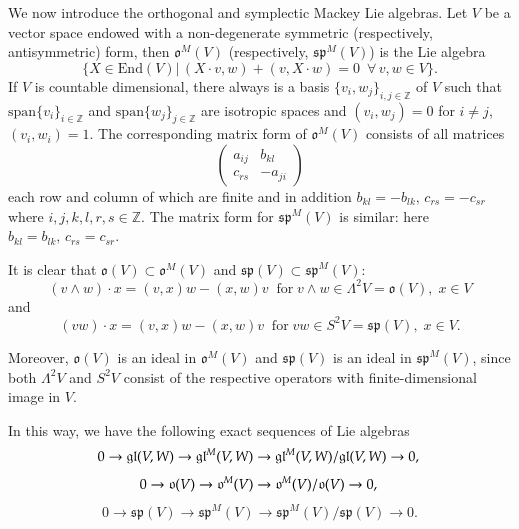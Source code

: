 \documentclass[10pt]{amsart}
\newcommand {\ZZ} {\mathbb {Z}}
\renewcommand{\sp}{\mathfrak{sp}}
\newcommand{\oo}{\mathfrak{o}}
\renewcommand{\span}{\mathrm{span}}
\newcommand{\gl}{\mathfrak{gl}}
\newcommand{\End}{\mathrm{End}}
\begin{document}
We now introduce the orthogonal and symplectic Mackey Lie algebras. Let $V$ be a vector space endowed with a non-degenerate symmetric 
(respectively, antisymmetric) form, then $\oo^M(V)$ (respectively, $\sp^M(V)$) is the Lie algebra
\begin{equation}\label{rel:Liealg}
 \lbrace X \in \End(V)|\,(X\cdot v,w)+(v,X\cdot w)=0 \,\,\, \forall \, v,w \in V\rbrace.
\end{equation}
If $V$ is countable dimensional, there always is a basis $\lbrace v_i,w_j\rbrace_{i,j \in \ZZ}$ of $V$ such that $\span\lbrace v_i\rbrace_{i \in \ZZ}$ and $\span\lbrace w_j\rbrace_{j \in \ZZ}$ are isotropic spaces and $(v_i, w_j) = 0$ for $i \neq j$, $(v_i, w_i)=1$. The corresponding matrix form of  $\oo^M(V)$ consists of all matrices
\begin{equation}\label{matrix}
\left(
\begin{array}{c|c}
 a_{ij} & b_{kl} \\ \hline
 c_{rs} & -a_{ji} 
\end{array}
\right) 
\end{equation}
each row and column of which are finite and in addition $b_{kl}=-b_{lk},\,c_{rs}=-c_{sr}$ where $i,j,k,l,r,s \in \ZZ$. The matrix form for $\sp^M(V)$ is similar: 
here $b_{kl} = b_{lk},\,c_{rs}=c_{sr}$.

It is clear that $\oo(V)\subset \oo^M(V)$ and
$\sp(V)\subset\sp^M(V)$:
\begin{equation}\label{eq:v_wedge_x}
 (v\wedge w)\cdot x = (v,x)w - (x,w)v \;\;\mathrm{for}\; v\wedge w \in \Lambda^2V = \oo(V),\;x\in V
\end{equation}
and
\begin{equation}
 (vw)\cdot x = (v,x)w - (x,w)v \;\;\mathrm{for}\; vw \in S^2V = \sp(V),\;x \in V.
\end{equation}


Moreover,  $\oo(V)$ is an ideal in $\oo^M(V)$ and $\sp(V)$ is an ideal in $\sp^M(V)$, since both $\Lambda^2 V$ and $S^2V$ consist of the respective operators with finite-dimensional image in $V$.

In this way, we have the following exact sequences of Lie algebras
\begin{equation}\label{seq:Lalg1}
 0 \rightarrow \gl(V,W) \rightarrow \gl^M(V,W) \rightarrow \gl^M(V,W) /\gl(V,W)  \rightarrow 0,  \\
\end{equation}
\begin{equation}\label{seq:Lalg2}
0 \rightarrow \oo(V) \rightarrow \oo^M(V) \rightarrow \oo^M(V) / \oo(V) \rightarrow 0,  \\ 
\end{equation}
\begin{equation}\label{seq:Lalg3}
0 \rightarrow \sp(V) \rightarrow \sp^M(V) \rightarrow \sp^M(V) / \sp(V) \rightarrow 0. 
\end{equation}
\end{document}

